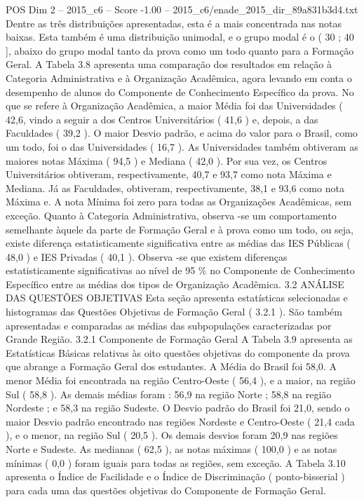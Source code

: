 \begin{textsample}{POS Dim 2 – 2015\_c6 – Score -1.00 – 2015\_c6/enade\_2015\_dir\_89a831b3d4.txt}
Dentre as três distribuições apresentadas, esta é a mais concentrada nas notas baixas.
Esta também é uma distribuição unimodal, e o grupo modal é o ( 30 ; 40 ], abaixo do grupo modal tanto da prova como um todo quanto para a Formação Geral.
A Tabela 3.8 apresenta uma comparação dos resultados em relação à Categoria Administrativa e à Organização Acadêmica, agora levando em conta o desempenho de alunos do Componente de Conhecimento Específico da prova.
No que se refere à Organização Acadêmica, a maior Média foi das Universidades ( 42,6, vindo a seguir a dos Centros Universitários ( 41,6 ) e, depois, a das Faculdades ( 39,2 ).
O maior Desvio padrão, e acima do valor para o Brasil, como um todo, foi o das Universidades ( 16,7 ).
As Universidades também obtiveram as maiores notas Máxima ( 94,5 ) e Mediana ( 42,0 ).
Por sua vez, os Centros Universitários obtiveram, respectivamente, 40,7 e 93,7 como nota Máxima e Mediana.
Já as Faculdades, obtiveram, respectivamente, 38,1 e 93,6 como nota Máxima e.
A nota Mínima foi zero para todas as Organizações Acadêmicas, sem exceção.
Quanto à Categoria Administrativa, observa -se um comportamento semelhante àquele da parte de Formação Geral e à prova como um todo, ou seja, existe diferença estatisticamente significativa entre as médias das IES Públicas ( 48,0 ) e IES Privadas ( 40,1 ).
Observa -se que existem diferenças estatisticamente significativas ao nível de 95 \% no Componente de Conhecimento Específico entre as médias dos tipos de Organização Acadêmica. 3.2 ANÁLISE DAS QUESTÕES OBJETIVAS Esta seção apresenta estatísticas selecionadas e histogramas das Questões Objetivas de Formação Geral ( 3.2.1 ).
São também apresentadas e comparadas as médias das subpopulações caracterizadas por Grande Região. 3.2.1 Componente de Formação Geral A Tabela 3.9 apresenta as Estatísticas Básicas relativas às oito questões objetivas do componente da prova que abrange a Formação Geral dos estudantes.
A Média do Brasil foi 58,0.
A menor Média foi encontrada na região Centro-Oeste ( 56,4 ), e a maior, na região Sul ( 58,8 ).
As demais médias foram : 56,9 na região Norte ; 58,8 na região Nordeste ; e 58,3 na região Sudeste.
O Desvio padrão do Brasil foi 21,0, sendo o maior Desvio padrão encontrado nas regiões Nordeste e Centro-Oeste ( 21,4 cada ), e o menor, na região Sul ( 20,5 ).
Os demais desvios foram 20,9 nas regiões Norte e Sudeste.
As medianas ( 62,5 ), as notas máximas ( 100,0 ) e as notas mínimas ( 0,0 ) foram iguais para todas as regiões, sem exceção.
A Tabela 3.10 apresenta o Índice de Facilidade e o Índice de Discriminação ( ponto-bisserial ) para cada uma das questões objetivas do Componente de Formação Geral.

\end{textsample}
